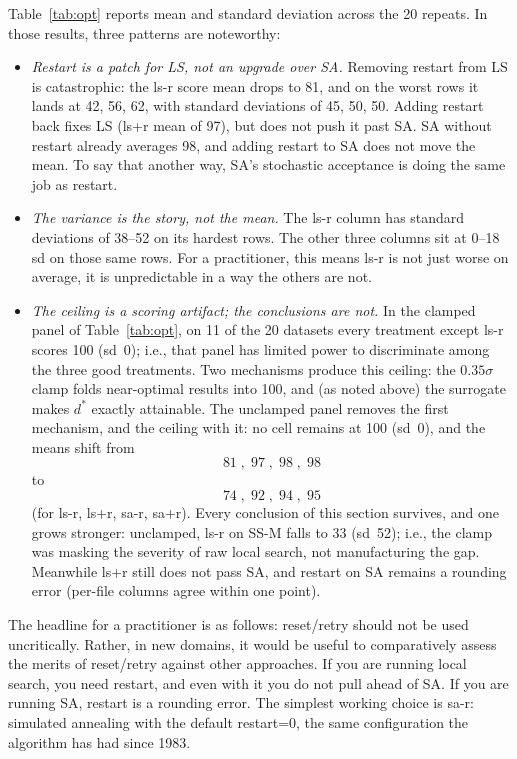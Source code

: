 \documentclass[AMA,STIX2COL]{WileyNJDv5}
\newcommand{\NEW}[1]{\textcolor{newblue}{#1}}
\begin{document}
 Table~\ref{tab:opt} reports mean and standard
deviation across the 20 repeats.
In those results, three patterns are noteworthy:
\begin{itemize}
\item
\textit{Restart is a patch for LS, not an upgrade over SA.}
Removing restart from LS is catastrophic: the \textsf{ls-r} score mean
drops to \NEW{81, and on the worst rows it lands at 42, 56, 62, with
standard deviations of 45, 50, 50.}   Adding restart back fixes
LS (\textsf{ls+r} mean of 97), but does not push it past SA. SA
without restart already averages \NEW{98}, and adding restart to SA
does not move the mean.
To say that another way,
SA's stochastic acceptance is doing
the same job as restart.
\item
\textit{The variance is the story, not the mean.} The \textsf{ls-r}
column has standard deviations of \NEW{38--52} on its hardest
rows. The other three columns sit at \NEW{0--18} sd on those same rows.
For a practitioner, this means \textsf{ls-r} is not just worse on
average, it is unpredictable in a way the others are not.
\item
\textit{The ceiling is a scoring artifact; the conclusions
are not.} In the clamped panel of Table~\ref{tab:opt}, on \NEW{11} of
the 20 datasets every treatment except \textsf{ls-r} scores
100 (sd~0); i.e., that panel has limited power to discriminate
among the three good treatments. Two mechanisms produce this
ceiling: the $0.35\sigma$ clamp folds near-optimal results into
100, and (as noted above) the surrogate makes $d^*$ exactly
attainable. The unclamped panel removes the first mechanism, and
the ceiling with it: no cell remains at 100 (sd~0), and the means
shift from
\NEW{\[81\;,\;97\;,\;98\;,\;98\]}
to 
\NEW{\[74\;,\;92\;,\;94\;,\;95\]}
(for \textsf{ls-r}, \textsf{ls+r}, \textsf{sa-r}, \textsf{sa+r}).
Every conclusion of this section survives, and one grows
stronger: unclamped, \textsf{ls-r} on SS-M falls to \NEW{33 (sd~52)};
i.e., the clamp was masking the severity of raw local search,
not manufacturing the gap. Meanwhile \textsf{ls+r} still does
not pass SA, and restart on SA remains a rounding error (per-file
columns agree within one point).
\end{itemize}
The headline for a practitioner is as follows:
 reset/retry should not be used uncritically.
Rather, in new domains, it would be useful to comparatively
assess the merits of reset/retry against other approaches.
If you are running local search,
you need restart, and even with it you do not pull ahead of SA.
If you are running SA, restart is a rounding error. The simplest
working choice is \textsf{sa-r}: simulated annealing with the
default \textsf{restart=0}, the same configuration the algorithm
has had since 1983.
\end{document}
